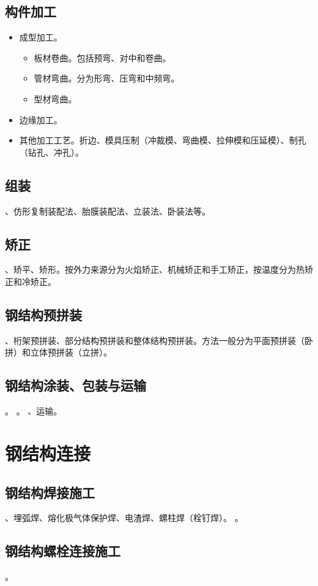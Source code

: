 \documentclass{book}
\begin{document}
\subsection{构件加工}
\begin{itemize}
    \item 成型加工。
          \begin{itemize}
              \item 板材卷曲。包括预弯、对中和卷曲。
              \item 管材弯曲。分为形弯、压弯和中频弯。
              \item 型材弯曲。
          \end{itemize}
    \item 边缘加工。
    \item 其他加工工艺。折边、模具压制（冲裁模、弯曲模、拉伸模和压延模）、制孔（钻孔、冲孔）。
\end{itemize}
\subsection{组装}
、仿形复制装配法、胎膜装配法、立装法、卧装法等。
\subsection{矫正}
、矫平、矫形。按外力来源分为火焰矫正、机械矫正和手工矫正，按温度分为热矫正和冷矫正。
\subsection{钢结构预拼装}
、桁架预拼装、部分结构预拼装和整体结构预拼装。方法一般分为平面预拼装（卧拼）和立体预拼装（立拼）。
\subsection{钢结构涂装、包装与运输}
。
。
、运输。
\section{钢结构连接}
\subsection{钢结构焊接施工}
、埋弧焊、熔化极气体保护焊、电渣焊、螺柱焊（栓钉焊）。
。
\subsection{钢结构螺栓连接施工}
。
\end{document}

